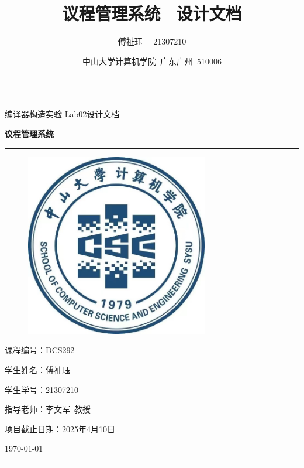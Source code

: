 \documentclass[a4paper, twoside, utf8]{ctexart}
\title{\songti \bfseries 议程管理系统 \ 设计文档}
\author{\fangsong 傅祉珏 \ \ 21307210}
\date{\fangsong 中山大学计算机学院\ 广东广州\ 510006}
\begin{document}
	
	\begin{titlepage}
		\centering
		\rule{\textwidth}{1pt}
		\vspace{0.02\textheight}
		
		{\LARGE \kaishu 编译器构造实验 \quad Lab02设计文档}
		
		\vspace{0.02\textheight}
		
		{\Huge \songti \bfseries 议程管理系统}
		
        \vspace{0.025\textheight}
        \rule{0.83\textwidth}{0.4pt}
        \vspace{0.05\textheight} 
        
        \begin{figure}[htbp]
            \centering
            \includegraphics[width=8cm, height=8cm]{./figure/计院院徽.jpg}
        \end{figure}

        \vspace{0.05\textheight} 
        {\Large 课程编号：\textsc{DCS292}}

        \vspace{0.025\textheight} 
        {\Large 学生姓名：\textsc{傅祉珏}}

        \vspace{0.025\textheight} 
        {\Large 学生学号：\textsc{21307210}}

        \vspace{0.025\textheight} 
        {\Large 指导老师：\textsc{李文军\ 教授}}
 
        \vspace{0.025\textheight} 
        {\Large 项目截止日期：\textsc{2025年4月10日}}

        \vspace{0.05\textheight} 
        \vfill

        {\large \today}
        \vspace{0.1\textheight}
        \rule{\textwidth}{1pt}
    \end{titlepage}
	
\end{document}
